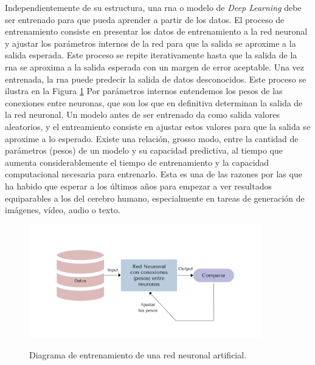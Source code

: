 Independientemente de su estructura, una \gls{rna} o modelo de \textit{Deep Learning} debe ser entrenado para que pueda aprender a partir de los datos. El proceso de entrenamiento consiste en presentar los datos de entrenamiento a la red neuronal y ajustar los parámetros internos de la red para que la salida se aproxime a la salida esperada. Este proceso se repite iterativamente hasta que la salida de la \gls{rna} se aproxima a la salida esperada con un margen de error aceptable. Una vez entrenada, la \gls{rna} puede predecir la salida de datos desconocidos. Este proceso se ilustra en la Figura \ref{fig:ann_training} Por parámetros internos entendemos los pesos de las conexiones entre neuronas, que son los que en definitiva determinan la salida de la red neuronal. Un modelo antes de ser entrenado da como salida valores aleatorios, y el entreamiento consiste en ajustar estos valores para que la salida se aproxime a lo esperado. Existe una relación, grosso modo, entre la cantidad de parámetros (pesos) de un modelo y su capacidad predictiva, al tiempo que aumenta considerablemente el tiempo de entrenamiento y la capacidad computacional necesaria para entrenarlo. Esta es una de las razones por las que ha habido que esperar a los últimos años para empezar a ver resultados equiparables a los del cerebro humano, especialmente en tareas de generación de imágenes, vídeo, audio o texto.

\begin{figure}[H]
    \caption[Diagrama de entrenamiento de una red neuronal artificial]{Diagrama de entrenamiento de una red neuronal artificial.}
    \centering
    \includegraphics[width=0.9\textwidth]{./figuras/ann_training.png}
    \label{fig:ann_training}
\end{figure}

